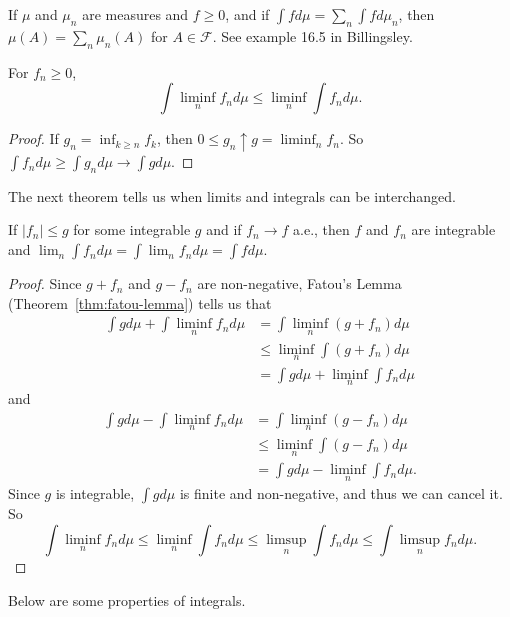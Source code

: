 \documentclass[11pt,fleqn]{book} %
\begin{document}
\begin{example}
	If $\mu$ and $\mu_n$ are measures and $f \geq 0$, and if $\int f d\mu = \sum_n \int f d\mu_n$, then $\mu(A) = \sum_n \mu_n(A)$ for $A \in \mathcal{F}$. See example 16.5 in Billingsley. 
\end{example}

\begin{theorem} \label{thm:fatou-lemma}
	For $f_n \geq 0$,
	\[
		\int \liminf_n f_n d\mu \leq \liminf_n \int f_n d\mu.
	\]
\end{theorem}

\begin{proof}
	If $g_n = \inf_{k \geq n} f_k$, then $0 \leq g_n \uparrow g = \liminf_n f_n$. So $\int f_n d\mu \geq \int g_n d\mu \to \int g d\mu$.
\end{proof}

The next theorem tells us when limits and integrals can be interchanged.

\begin{theorem} \label{thm:dominated-convergence}
	If $|f_n| \leq g$ for some integrable $g$ and if $f_n \to f$ a.e., then $f$ and $f_n$ are integrable and $\lim_n \int f_n d\mu = \int \lim_n f_n d\mu = \int f d\mu$.
\end{theorem}

\begin{proof}
	Since $g+f_n$ and $g-f_n$ are non-negative, Fatou's Lemma (Theorem~\ref{thm:fatou-lemma}) tells us that 
	\begin{align*}
		\int g d\mu + \int \liminf_n f_n d\mu &= \int \liminf_n (g+f_n) d\mu \\
		&\leq \liminf_n \int (g+f_n) d\mu \\
		&= \int g d\mu + \liminf_n \int f_n d\mu
	\end{align*}
	and
	\begin{align*}
		\int g d\mu - \int \liminf_n f_n d\mu &= \int \liminf_n (g-f_n) d\mu \\
		&\leq \liminf_n \int (g-f_n) d\mu \\
		&= \int g d\mu - \liminf_n \int f_n d\mu.
	\end{align*}
	Since $g$ is integrable, $\int g d\mu$ is finite and non-negative, and thus we can cancel it. So
	\[
		\int \liminf_n f_n d\mu \leq \liminf_n \int f_n d\mu \leq \limsup_n \int f_n d\mu \leq \int \limsup_n f_n d\mu.
	\]
\end{proof}

Below are some properties of integrals.
\vspace{10pt}
\end{document}

